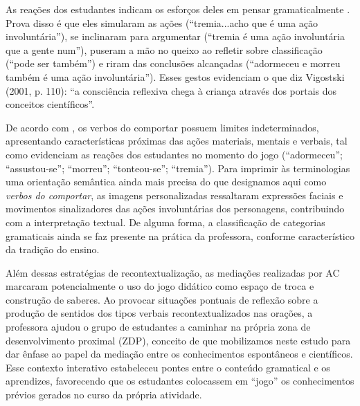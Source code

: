 	As reações dos estudantes indicam os esforços deles em pensar
	gramaticalmente \cite[]{halliday_grammar_2000}. Prova disso é que eles simularam as
	ações (``tremia...acho que é uma ação involuntária''), se inclinaram
	para argumentar (``tremia é uma ação involuntária que a gente num''),
	puseram a mão no queixo ao refletir sobre classificação (``pode ser
	também'') e riram das conclusões alcançadas (``adormeceu e morreu também
	é uma ação involuntária''). Esses gestos evidenciam o que diz Vigostski
	(2001, p. 110): ``a consciência reflexiva chega à criança através dos
	portais dos conceitos científicos''.
	
	De acordo com \textcite[p. 301]{halliday_hallidays_2014}, os verbos do
	comportar possuem limites indeterminados, apresentando características
	próximas das ações materiais, mentais e verbais, tal como evidenciam as
	reações dos estudantes no momento do jogo (``adormeceu'';
	``assustou-se''; ``morreu''; ``tonteou-se''; ``tremia''). Para imprimir
	às terminologias uma orientação semântica ainda mais precisa do que
	designamos aqui como \emph{verbos do comportar}, as imagens
	personalizadas ressaltaram expressões faciais e movimentos sinalizadores
	das ações involuntárias dos personagens, contribuindo com a
	interpretação textual. De alguma forma, a classificação de categorias
	gramaticais ainda se faz presente na prática da professora, conforme
	característico da tradição do ensino.
	
	Além dessas estratégias de recontextualização, as mediações realizadas
	por AC marcaram potencialmente o uso do jogo didático como espaço de
	troca e construção de saberes. Ao provocar situações pontuais de
	reflexão sobre a produção de sentidos dos tipos verbais
	recontextualizados nas orações, a professora ajudou o grupo de
	estudantes a caminhar na própria zona de desenvolvimento proximal (ZDP),
	conceito de \textcite{vigotski_construco_2001} que mobilizamos neste estudo para dar ênfase
	ao papel da mediação entre os conhecimentos espontâneos e científicos.
	Esse contexto interativo estabeleceu pontes entre o conteúdo gramatical
	e os aprendizes, favorecendo que os estudantes colocassem em ``jogo'' os
	conhecimentos prévios gerados no curso da própria atividade.
	
